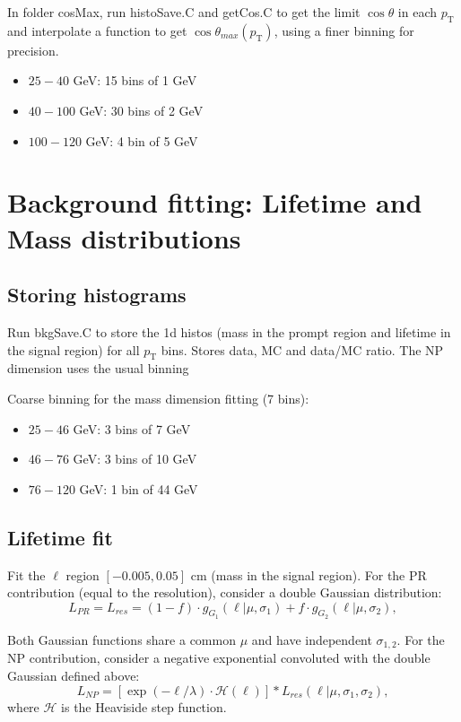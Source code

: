 \documentclass{article}
\newcommand{\pt}{p_\text{T}}
\newcommand{\cost}{\cos\theta}
\begin{document}
In folder cosMax, run histoSave.C and getCos.C to get the limit $\cost$ in each $\pt$ and interpolate a function to get $\cost_{max}(\pt)$, using a finer binning for precision.
\begin{itemize}
\item $25-40$ GeV: 15 bins of 1 GeV
\item $40-100$ GeV: 30 bins of 2 GeV
\item $100-120$ GeV: 4 bin of 5 GeV
\end{itemize}

\pagebreak

\section{Background fitting: Lifetime and Mass distributions}

\subsection{Storing histograms}

Run bkgSave.C to store the 1d histos (mass in the prompt region and lifetime in the signal region) for all $\pt$ bins. Stores data, MC and data/MC ratio. The NP dimension uses the usual binning

Coarse binning for the mass dimension fitting (7 bins):
\begin{itemize}
\item $25-46$ GeV: 3 bins of 7 GeV
\item $46-76$ GeV: 3 bins of 10 GeV
\item $76-120$ GeV: 1 bin of 44 GeV
\end{itemize}

\subsection{Lifetime fit}

Fit the $\ell$ region $[-0.005,0.05]$ cm (mass in the signal region). For the PR contribution (equal to the resolution), consider a double Gaussian distribution:
\begin{equation}
L_{PR}=L_{res} = (1-f)\cdot g_{G_1}(\ell|\mu, \sigma_1)+f\cdot g_{G_2}(\ell|\mu, \sigma_2),
\end{equation}

Both Gaussian functions share a common $\mu$ and have independent $\sigma_{1,2}$. For the NP contribution, consider a negative exponential convoluted with the double Gaussian defined above:
\begin{equation}
L_{NP}=	\left[\exp(-\ell/\lambda)\cdot\mathcal{H}(\ell)\right]*L_{res}(\ell|\mu, \sigma_1,\sigma_2),
\end{equation}
where $\mathcal{H}$ is the Heaviside step function.
\end{document}

